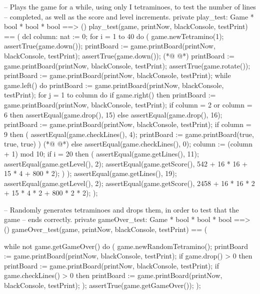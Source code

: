 \begin{vdmpp}[breaklines=true]
  -- Plays the game for a while, using only I tetraminoes, to test the number of lines
  -- completed, as well as the score and level increments.
  private play_test: Game * bool * bool * bool ==> ()
  play_test(game, printNow, blackConsole, testPrint) == (
   dcl column: nat := 0;
   for i = 1 to 40 do (
    game.newTetramino(1);
    assertTrue(game.down());
    printBoard := game.printBoard(printNow, blackConsole, testPrint);
    assertTrue(game.down());
(*@
\label{gameOver:test:510}
@*)
    printBoard := game.printBoard(printNow, blackConsole, testPrint);
    assertTrue(game.rotate());
    printBoard := game.printBoard(printNow, blackConsole, testPrint);
    while game.left() do
     printBoard := game.printBoard(printNow, blackConsole, testPrint);
    for j = 1 to column do
     if game.right() then
      printBoard := game.printBoard(printNow, blackConsole, testPrint);
    if column = 2 or column = 6 then assertEqual(game.drop(), 15)
    else assertEqual(game.drop(), 16);
    printBoard := game.printBoard(printNow, blackConsole, testPrint);
    if column = 9 then (
     assertEqual(game.checkLines(), 4);
     printBoard := game.printBoard(true, true, true)
    )
(*@
\label{main:525}
@*)
    else assertEqual(game.checkLines(), 0);
    column := (column + 1) mod 10;
    if i = 20 then (
     assertEqual(game.getLines(), 11);
     assertEqual(game.getLevel(), 2);
     assertEqual(game.getScore(), 542 + 16 * 16 + 15 * 4 + 800 * 2);
    )
   );
   assertEqual(game.getLines(), 19);
   assertEqual(game.getLevel(), 2);
   assertEqual(game.getScore(), 2458 + 16 * 16 * 2 + 15 * 4 * 2 + 800 * 2 * 2);
  ); 
  
  -- Randomly generates tetraminoes and drops them, in order to test that the game
  -- ends correctly.
  private gameOver_test: Game * bool * bool * bool ==> ()
  gameOver_test(game, printNow, blackConsole, testPrint) == (
  
   while not game.getGameOver() do (
    game.newRandomTetramino();
    printBoard := game.printBoard(printNow, blackConsole, testPrint);
    if game.drop() > 0 
    then printBoard := game.printBoard(printNow, blackConsole, testPrint);
    if game.checkLines() > 0
    then printBoard := game.printBoard(printNow, blackConsole, testPrint);
   );
   assertTrue(game.getGameOver());
  );


\end{vdmpp}
